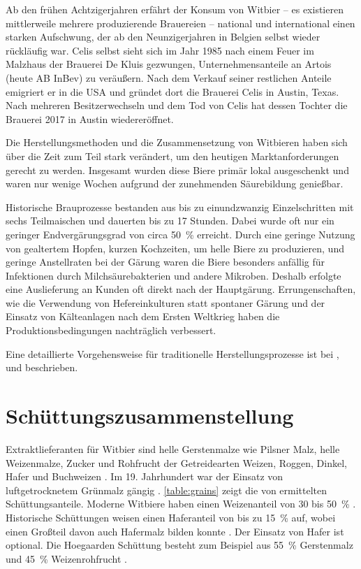 \documentclass[a4paper,parskip=half]{scrartcl}
\begin{document}
Ab den frühen Achtzigerjahren erfährt der Konsum von Witbier – es
existieren mittlerweile mehrere produzierende Brauereien – national und
international einen starken Aufschwung, der
ab den Neunzigerjahren in Belgien selbst wieder rückläufig war.
Celis selbst sieht sich im Jahr 1985 nach einem Feuer im Malzhaus der Brauerei
De Kluis gezwungen, Unternehmensanteile an Artois (heute
AB InBev) zu veräußern. Nach dem Verkauf seiner restlichen Anteile
emigriert er in die USA und gründet dort die Brauerei Celis in Austin,
Texas. Nach mehreren Besitzerwechseln und dem Tod von Celis
hat dessen Tochter die Brauerei 2017 in Austin wiedereröffnet.
\parencites[1]{Strottner1999}[37,49]{Hieronymus2010}{Meewes2017}

Die Herstellungsmethoden und die Zusammensetzung von Witbieren haben
sich über die Zeit zum Teil stark verändert, um den heutigen
Marktanforderungen gerecht zu werden. Insgesamt wurden diese
Biere primär lokal ausgeschenkt und waren nur wenige
Wochen aufgrund der zunehmenden Säurebildung genießbar.
\parencite[118]{Strottner1999}

Historische Brauprozesse bestanden aus bis zu einundzwanzig
Einzelschritten mit sechs Teilmaischen und dauerten bis zu
17 Stunden. Dabei wurde oft nur ein geringer Endvergärungsgrad
von circa 50~\% erreicht. Durch eine geringe Nutzung von gealtertem
Hopfen, kurzen Kochzeiten, um helle Biere zu produzieren, 
und geringe Anstellraten bei der Gärung waren die Biere besonders
anfällig für Infektionen durch Milchsäurebakterien und andere Mikroben.
Deshalb erfolgte eine Auslieferung an Kunden oft direkt nach
der Hauptgärung. Errungenschaften, wie die Verwendung von
Hefereinkulturen statt spontaner Gärung und der Einsatz von
Kälteanlagen nach dem Ersten Weltkrieg haben die Produktionsbedingungen
nachträglich verbessert. \parencite[38-41]{Hieronymus2010}

Eine detaillierte Vorgehensweise für traditionelle Herstellungsprozesse
ist bei \citeauthor{Hieronymus2010}, \citeauthor{Mulder2020} und
\citeauthor{Strottner1999} beschrieben.

\section*{Schüttungszusammenstellung}

Extraktlieferanten für Witbier sind helle Gerstenmalze wie Pilsner Malz,
helle Weizenmalze, Zucker und Rohfrucht der Getreidearten Weizen, Roggen,
Dinkel, Hafer und Buchweizen \parencite[14]{Strottner1999}. Im 19.
Jahrhundert war der Einsatz von luftgetrocknetem Grünmalz gängig
\parencite[38]{Hieronymus2010}. \autoref{table:grains} zeigt die von \citeauthor{Strottner1999}
ermittelten Schüttungsanteile. Moderne Witbiere haben einen Weizenanteil
von 30 bis 50~\% \parencite[45]{Mulder2020}. Historische
Schüttungen weisen einen Haferanteil von bis zu 15~\% auf, wobei
einen Großteil davon auch Hafermalz bilden konnte \parencite[45]{Hieronymus2010}.
Der Einsatz von Hafer ist optional. Die Hoegaarden Schüttung
besteht zum Beispiel aus 55~\% Gerstenmalz und 45~\% Weizenrohfrucht \parencite[43]{Strottner1999}.
\end{document}
